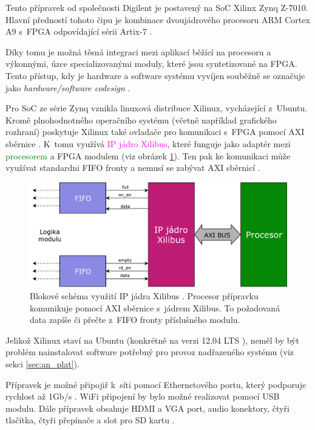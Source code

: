Tento přípravek od společnosti Digilent je postavený na SoC Xilinx Zynq Z-7010. Hlavní předností tohoto čipu je kombinace dvoujádrového procesoru ARM Cortex A9 s~FPGA odpovídající sérii Artix-7 \cite{zybo_man}. 

Díky tomu je možná těsná integraci mezi aplikací běžící na procesoru a výkonnými, úzce specializovanými moduly, které jsou syntetizované na FPGA. Tento přístup, kdy je hardware a software systému vyvíjen souběžně se označuje jako \textit{hardware/software codesign} \cite{hw_code}.

Pro SoC ze série Zynq vznikla linuxová distribuce Xilinux, vycházející z~Ubuntu. Kromě plnohodnotného operačního systému (včetně například grafického rozhraní) poskytuje Xilinux také ovladače pro komunikaci s~FPGA pomocí AXI sběrnice \cite{xilibus}. K~tomu využívá \textcolor{magenta}{IP jádro Xilibus}, které funguje jako adaptér mezi \textcolor{green}{procesorem} a FPGA modulem (viz obrázek \ref{fig:xilibus}). Ten pak ke komunikaci může využívat standardni \textcolor{blue2}{FIFO} fronty a nemusí se zabývat AXI sběrnicí \cite{xilibus}.

\begin{figure}[h!]
    \centering
    \includegraphics[width=\textwidth]{images/xilibus.pdf}
    \caption[Blokové schéma využití IP jádra Xilibus]{Blokové schéma využití IP jádra Xilibus \cite{xilibus}. Procesor přípravku komunikuje pomocí AXI sběrnice s~jádrem Xilibus. To požadovaná data zapíše či přečte z~FIFO fronty příslušného modulu.}
    \label{fig:xilibus}
\end{figure}

Jelikož Xilinux staví na Ubuntu (konkrétně na verzi 12.04 LTS \cite{xilibus}), neměl by být problém nainstalovat software potřebný pro provoz nadřazeného systému (viz sekci \ref{sec:an_plat}). 

Přípravek je možné připojiř k~síti pomocí Ethernetového portu, který podporuje rychlost až 1Gb/s \cite{zybo_man}. WiFi připojení by bylo možné realizovat pomocí USB modulu. Dále přípravek obsahuje HDMI a VGA port, audio konektory, čtyři tlačítka, čtyři přepínače a slot pro SD kartu \cite{zybo_man}.

